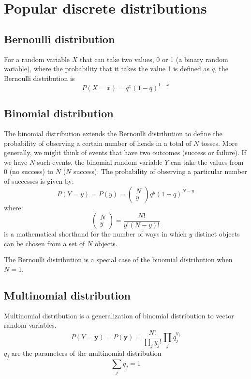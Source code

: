 \section{Popular discrete distributions}

\subsection{Bernoulli distribution}

For a random variable $X$ that can take two values, 0 or 1 (a binary random variable),
where the probability that it takes the value 1 is defined as $q$, the Bernoulli distribution
is
\begin{equation}
P(X=x) = q^{x} (1 - q)^{1-x}
\end{equation}


\subsection{Binomial distribution}

The binomial distribution extends the Bernoulli distribution to define the probability
of observing a certain number of heads in a total of $N$ tosses. More generally, we
might think of events that have two outcomes (success or failure). If we have $N$ such
events, the binomial random variable $Y$ can take the values from 0 (no success) to
$N$ ($N$ success). The probability of observing a particular number of successes is given
by:
\begin{equation}
P(Y=y) = P(y) = \begin{pmatrix}N \\ y\end{pmatrix} q^{y} (1-q)^{N-y}
\end{equation}
where:
\begin{equation}
\begin{pmatrix}N \\ y \end{pmatrix} = \frac{N!}{y!(N-y)!}
\end{equation}
is a mathematical shorthand for the number of ways in which $y$ distinct objects can
be chosen from a set of $N$ objects.

The Bernoulli distribution is a special case of the binomial distribution when $N=1$.

\subsection{Multinomial distribution}
Multinomial distribution is a generalization of binomial distribution to vector
random variables.
\begin{equation}
P(Y=\mathbf{y}) = P(\mathbf{y}) = \frac{N!}{\prod_{j}y_{j}!}\prod_{j} q_{j}^{y_{j}}
\end{equation}
$q_{j}$ are the parameters of the multinomial distribution
\begin{equation*}
\sum_{j} q_{j} = 1
\end{equation*}



